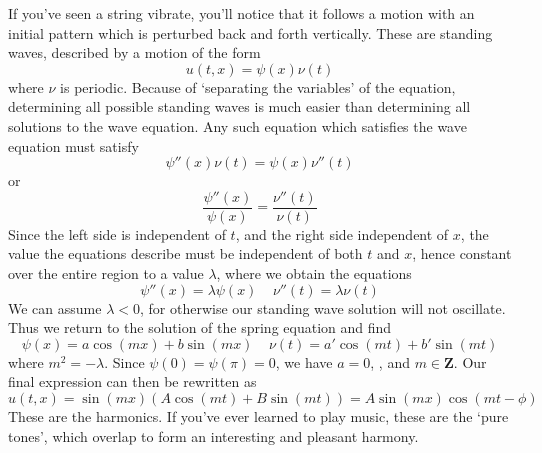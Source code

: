 If you've seen a string vibrate, you'll notice that it follows a motion with an initial pattern which is perturbed back and forth vertically. These are standing waves, described by a motion of the form
%
\[ u(t,x) = \psi(x) \nu(t) \]
%
where $\nu$ is periodic. Because of `separating the variables' of the equation, determining all possible standing waves is much easier than determining all solutions to the wave equation. Any such equation which satisfies the wave equation must satisfy
%
\[ \psi''(x) \nu(t) = \psi(x) \nu''(t) \]
%
or
%
\[ \frac{\psi''(x)}{\psi(x)} = \frac{\nu''(t)}{\nu(t)} \]
%
Since the left side is independent of $t$, and the right side independent of $x$, the value the equations describe must be independent of both $t$ and $x$, hence constant over the entire region to a value $\lambda$, where we obtain the equations
%
\[ \psi''(x) = \lambda \psi(x)\ \ \ \ \ \nu''(t) = \lambda \nu(t) \]
%
We can assume $\lambda < 0$, for otherwise our standing wave solution will not oscillate. Thus we return to the solution of the spring equation and find
%
\[ \psi(x) = a \cos(mx) + b \sin(mx) \ \ \ \ \ \nu(t) = a' \cos(mt) + b' \sin(mt) \]
%
where $m^2 = -\lambda$. Since $\psi(0) = \psi(\pi) = 0$, we have $a = 0$, , and $m \in \mathbf{Z}$. Our final expression can then be rewritten as
%
\[ u(t,x) = \sin(mx) (A \cos(mt) + B \sin(mt)) = A \sin(mx) \cos(mt - \phi) \]
%
These are the harmonics. If you've ever learned to play music, these are the `pure tones', which overlap to form an interesting and pleasant harmony.

